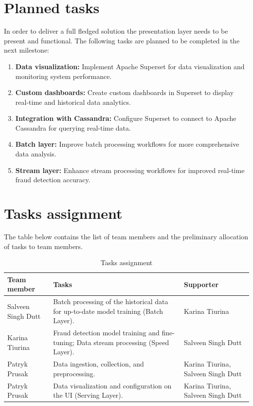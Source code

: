 \documentclass[12pt,a4paper, hidelinks]{article}
\begin{document}
\section{Planned tasks}
In order to deliver a full fledged solution the presentation layer needs to be present and functional. The following tasks are planned to be completed in the next milestone:
\begin{enumerate}
    \item \textbf{Data visualization:} Implement Apache Superset for data visualization and monitoring system performance.
    \item \textbf{Custom dashboards:} Create custom dashboards in Superset to display real-time and historical data analytics.
    \item \textbf{Integration with Cassandra:} Configure Superset to connect to Apache Cassandra for querying real-time data.
    \item \textbf{Batch layer:} Improve batch processing workflows for more comprehensive data analysis.
    \item \textbf{Stream layer:} Enhance stream processing workflows for improved real-time fraud detection accuracy.
\end{enumerate}


\section{Tasks assignment}

The table below contains the list of team members and the preliminary allocation of tasks to team members.

\begin{table}[htbp]
\centering
\begin{tabular}{|p{4cm}|p{6.5cm}|p{4cm}|}
\hline
\textbf{Team member} & \textbf{Tasks} & \textbf{Supporter} \\
\hline
Salveen Singh Dutt & Batch processing of the historical data for up-to-date model training (Batch Layer). & Karina Tiurina \\
\hline
Karina Tiurina & Fraud detection model training and fine-tuning; Data stream processing (Speed Layer). & Salveen Singh Dutt \\
\hline
Patryk Prusak & Data ingestion, collection, and preprocessing. & Karina Tiurina, Salveen Singh Dutt  \\
\hline
Patryk Prusak & Data visualization and configuration on the UI (Serving Layer). & Karina Tiurina, Salveen Singh Dutt \\
\hline
\end{tabular}
\caption{Tasks assignment}
\end{table}
\end{document}
